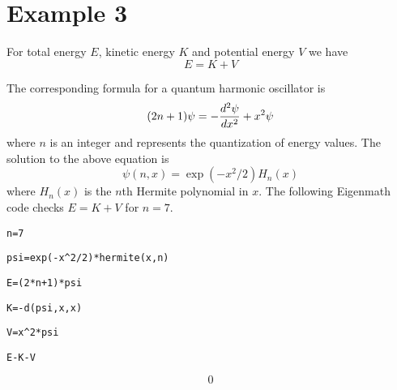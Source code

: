 
\newpage

\section*{Example 3}

For total energy $E$, kinetic energy $K$ and potential energy $V$ we have
$$E=K+V$$

\medskip
\noindent
The corresponding formula for a quantum harmonic oscillator is
$$(2n+1)\psi=-{d^2\psi\over dx^2}+x^2\psi$$
where $n$ is an integer and represents the quantization of energy values.
The solution to the above equation is
$$\psi(n,x)=\exp(-x^2/2)H_n(x)$$
where $H_n(x)$ is the $n$th Hermite polynomial in $x$.
The following Eigenmath code checks $E=K+V$ for $n=7$.

\medskip
\verb$n=7$

\verb$psi=exp(-x^2/2)*hermite(x,n)$

\verb$E=(2*n+1)*psi$

\verb$K=-d(psi,x,x)$

\verb$V=x^2*psi$

\verb$E-K-V$

$$0$$

